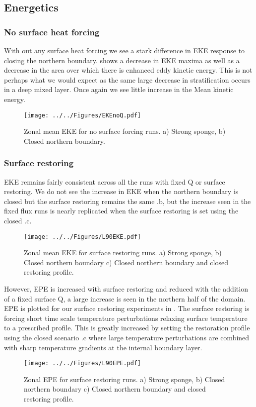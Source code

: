 \subsection*{Energetics}

\subsubsection*{No surface heat forcing}

With out any surface heat forcing we see a stark difference in EKE response to closing the northern boundary.  shows a decrease in EKE maxima as well as a decrease in the area over which there is enhanced eddy kinetic energy. This is not perhaps what we would expect as the same large decrease in stratification occurs in a deep mixed layer. Once again we see little increase in the Mean kinetic energy.
\begin{figure}[H]
\center
\noindent \texttt{[image: ../../Figures/EKEnoQ.pdf]} 
\caption{Zonal mean EKE for no surface forcing runs. a) Strong sponge, b) Closed northern boundary.}
\label{fig:noQeke}
\end{figure}

\subsubsection*{Surface restoring}
EKE remains fairly consistent across all the runs with fixed Q or surface restoring. We do not see the increase in EKE when the northern boundary is closed but the surface restoring remains the same .b, but the increase seen in the fixed flux runs is nearly replicated when the surface restoring is set using the closed .c. 
\begin{figure}[H]
\center
\noindent \texttt{[image: ../../Figures/L90EKE.pdf]} 
\caption{Zonal mean EKE for surface restoring runs. a) Strong sponge, b) Closed northern boundary c) Closed northern boundary and closed restoring profile.}
\label{fig:L90eke}
\end{figure}
However, EPE is increased with surface restoring and reduced with the addition of a fixed surface Q, a large increase is seen in the northern half of the domain. EPE is plotted for our surface restoring experiments in . The surface restoring is forcing short time scale temperature perturbations relaxing surface temperature to a prescribed profile. This is greatly increased by setting the restoration profile using the closed scenario .c where large temperature perturbations are combined with sharp temperature gradients at the internal boundary layer.
\begin{figure}[H]
\center
\noindent \texttt{[image: ../../Figures/L90EPE.pdf]} 
\caption{Zonal EPE for surface restoring runs. a) Strong sponge, b) Closed northern boundary c) Closed northern boundary and closed restoring profile.}
\label{fig:L90epe}
\end{figure}



